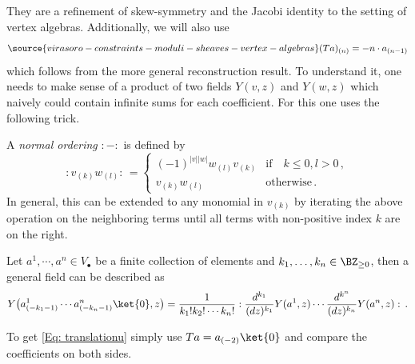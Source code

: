 They are a refinement of skew-symmetry and the Jacobi identity to the setting of vertex algebras.
Additionally, we will also use
\begin{equation}
\label{Eq: translationu}
\source{virasoro-constraints-moduli-sheaves-vertex-algebras}
(Ta)_{(n)} = -n\cdot a_{(n-1)}
\end{equation}
which follows from the more general reconstruction result.
To understand it, one needs to make sense of a product of two fields $Y(v,z)$ and $Y(w,z)$ which naively could contain infinite sums for each coefficient. For this one uses the following trick.
\begin{definition}[{\cite[(2.3.5)]{Ka98}}]
\notready
 A \textit{normal ordering} $:-:$ is defined by
$$
:v_{(k)} w_{(l)}: \,=\begin{cases}(-1)^{|v||w|}w_{(l)}v_{(k)}&\text{if} \quad k\leq 0,l>0\,,\\
v_{(k)}w_{(l)}& \text{otherwise}\,.\end{cases}
$$
In general, this can be extended to any monomial in $v_{(k)}$ by iterating the above operation on the neighboring terms until all terms with non-positive index $k$ are on the right.
\end{definition}


\begin{theorem}[{\cite[Corollary 4.5]{Ka98}}]
\notready
    Let $a^1,\cdots, a^n\in V_{\bullet}$ be a finite collection of elements and $k_1,\dots,k_n\in \BZ_{\geq 0}$, then a general field can be described as
    $$
    Y\big(a^1_{(-k_1-1)}\cdots a^n_{(-k_n-1)}\ket{0},z\big)
= \frac{1}{k_1!k_2!\cdots k_n !}:\frac{d^{k_1}}{(dz)^{k_1}}Y(a^1,z)\cdots \frac{d^{k^n}}{(dz)^{k_n}}Y(a^n,z):\,.
    $$
\end{theorem}
To get \eqref{Eq: translationu} simply use $Ta = a_{(-2)}\ket{0}$ and compare the coefficients on both sides.

